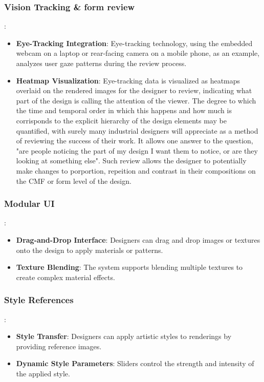 \documentclass{article}
\begin{document}
\begin{itemize}
\subsubsection{Vision Tracking & form review}:
\begin{itemize}
    \item \textbf{Eye-Tracking Integration}: Eye-tracking technology, using the embedded webcam on a laptop or rear-facing camera on a mobile phone, as an example, analyzes user gaze patterns during the review process.
    \item \textbf{Heatmap Visualization}: Eye-tracking data is visualized as heatmaps overlaid on the rendered images for the designer to review, indicating what part of the design is calling the attention of the viewer. The degree to which the time and temporal order in which this happens and how much is corrisponds to the explicit hierarchy of the design elements may be quantified, with surely many industrial designers will appreciate as a method of reviewing the success of their work. It allows one answer to the question, "are people noticing the part of my design I want them to notice, or are they looking at something else". Such review allows the designer to potentially make changes to porportion, repeition and contrast in their compositions on the CMF or form level of the design.
\end{itemize}

\subsubsection{Modular UI}:
\begin{itemize}
    \item \textbf{Drag-and-Drop Interface}: Designers can drag and drop images or textures onto the design to apply materials or patterns.
    \item \textbf{Texture Blending}: The system supports blending multiple textures to create complex material effects.
\end{itemize}

\subsubsection{Style References}:
\begin{itemize}
    \item \textbf{Style Transfer}: Designers can apply artistic styles to renderings by providing reference images.
    \item \textbf{Dynamic Style Parameters}: Sliders control the strength and intensity of the applied style.
\end{itemize}


\end{itemize}
\end{document}
